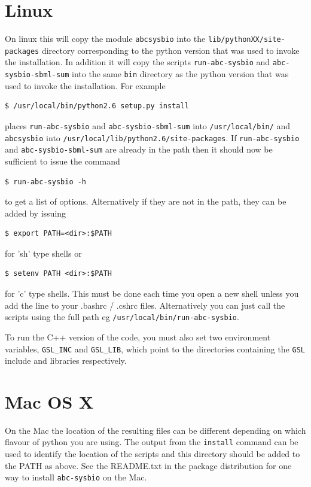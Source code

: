 \documentclass[a4paper]{report}
\begin{document}
\section{Linux}
On linux this will copy the module \verb$abcsysbio$ into the \verb$lib/pythonXX/site-packages$ directory corresponding to the python version that was used to invoke the installation. In addition it will copy the scripts \verb$run-abc-sysbio$ and \verb$abc-sysbio-sbml-sum$ into the same \verb$bin$ directory as the python version that was used to invoke the installation. For example
\begin{verbatim}
$ /usr/local/bin/python2.6 setup.py install
\end{verbatim}
places \verb$run-abc-sysbio$ and \verb$abc-sysbio-sbml-sum$ into \verb$/usr/local/bin/$ and \verb$abcsysbio$ into \verb$/usr/local/lib/python2.6/site-packages$. If \verb$run-abc-sysbio$ and \verb$abc-sysbio-sbml-sum$ are already in the path then it should now be sufficient to issue the command
\begin{verbatim}
$ run-abc-sysbio -h
\end{verbatim}
to get a list of options. Alternatively if they are not in the path, they can be added by issuing
\begin{verbatim}
$ export PATH=<dir>:$PATH 
\end{verbatim}
for 'sh' type shells or
\begin{verbatim}
$ setenv PATH <dir>:$PATH 
\end{verbatim}
for 'c' type shells. This must be done each time you open a new shell unless you add the line to your .bashrc / .cshrc files. Alternatively you can just call the scripts using the full path eg \verb$/usr/local/bin/run-abc-sysbio$.

To run the C++ version of the code, you must also set two environment variables, \verb$GSL_INC$ and \verb$GSL_LIB$, which point to the directories containing the \verb$GSL$ include and libraries respectively.

\section{Mac OS X}
On the Mac the location of the resulting files can be different depending on which flavour of python you are using. The output from the \verb$install$ command can be used to identify the location of the scripts and this directory should be added to the PATH as above.
See the README.txt in the package distribution for one way to install \verb$abc-sysbio$ on the Mac.
\end{document}
